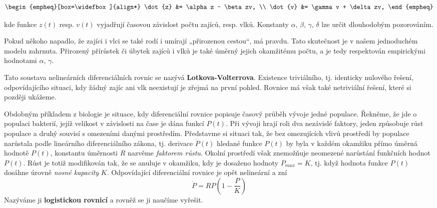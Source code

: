       \begin{subequations}
        \begin{empheq}[box=\widefbox]{align*}
          \dot{z} &= \alpha z - \beta zv,     \\
          \dot{v} &= \gamma v + \delta zv,
        \end{empheq}
      \end{subequations}

      kde funkce \(z(t)\) resp. \(v(t)\) vyjadřují časovou závislost počtu zajíců, resp. vlků.
      Konstanty \(\alpha\), \(\beta\), \(\gamma\), \(\delta\) lze určit dlouhodobým pozorováním. 
      \begin{note}
        Pokud někoho napadlo, že zajíci i vlci se také rodí i umírají „přirozenou cestou“, má
        pravdu. Tato skutečnost je v našem jednoduchém modelu zahrnuta. Přirozený přírůstek či
        úbytek zajíců i vlků je také úměrný jejich okamžitému počtu, a je tedy respektován
        empirickými hodnotami \(\alpha\), \(\gamma\).
      \end{note}
      
      Tato soustava nelineárních diferenciálních rovnic se nazývá \textbf{Lotkova-Volterrova}. 
      Existence triviálního, tj. identicky nulového řešení, odpovídajícího situaci, kdy žádný zajíc 
      ani vlk neexistují je zřejmá na první pohled. Rovnice má však také netriviální řešení, které 
      si později ukážeme. 
      
      Obdobným příkladem z biologie je situace, kdy diferenciální rovnice popisuje časový průběh
      vývoje jedné populace. Řekněme, že jde o populaci bakterií, jejíž velikost v závislosti na
      čase je dána funkcí \(P(t)\). Při vývoji hrají roli dva nezávislé faktory, jeden způsobuje
      růst populace a druhý souvisí s omezeními danými prostředím. Představme si situaci tak, že bez
      omezujících vlivů prostředí by populace narůstala podle lineárního diferenciálního zákona, tj.
      derivace \(\dot{P}(t)\) hledané funkce \(P(t)\) by byla v každém okamžiku přímo úměrná hodnotě
      \(P(t)\), konstantu úměrnosti \(R\) nazvěme \emph{faktorem růstu}. Okolní prostředí však
      znemožňuje neomezené narůstání funkčních hodnot \(P(t)\). Růst je totiž modifikován tak, že se
      anuluje v okamžiku, kdy je dosaženo  hodnoty \(P_{max} = K\), tj. když hodnota
      funkce \(P(t)\) dosáhne úrovně \emph{nosné kapacity} \(K\). Odpovídající diferenciální rovnice
      je opět nelineární a zní
      \begin{equation*}
        \boxed{\dot{P} = RP\left(1 - \dfrac{P}{K}\right)}
      \end{equation*}
      Nazýváme ji \textbf{logistickou rovnicí} a rovněž se ji naučíme vyřešit.
      
